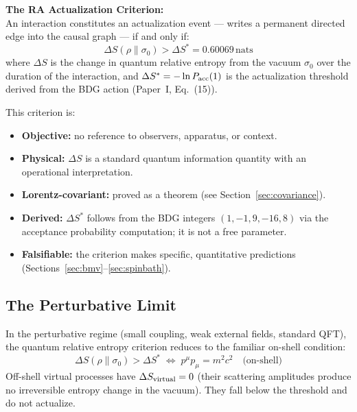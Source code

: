 \documentclass[12pt,a4paper]{article}
\begin{document}
\begin{mdframed}[linecolor=cv_blue!60,backgroundcolor=cv_blue!5,linewidth=1.5pt]
\textbf{The RA Actualization Criterion:}\\[0.3em]
An interaction constitutes an actualization event --- writes a permanent directed edge into the causal graph --- if and only if:
\begin{equation}
  \Delta S(\rho\|\sigma_0) > \Delta S^* = 0.60069\,\mathrm{nats}
  \label{eq:criterion}
\end{equation}
where $\Delta S$ is the change in quantum relative entropy from the vacuum $\sigma_0$ over the duration of the interaction, and $\Delta S^* = -\ln P_{\rm acc}(1)$ is the actualization threshold derived from the BDG action (Paper~I, Eq.~(15)).
\end{mdframed}

This criterion is:
\begin{itemize}
  \item \textbf{Objective:} no reference to observers, apparatus, or context.
  \item \textbf{Physical:} $\Delta S$ is a standard quantum information quantity with an operational interpretation.
  \item \textbf{Lorentz-covariant:} proved as a theorem (see Section~\ref{sec:covariance}).
  \item \textbf{Derived:} $\Delta S^*$ follows from the BDG integers $(1,-1,9,-16,8)$ via the acceptance probability computation; it is not a free parameter.
  \item \textbf{Falsifiable:} the criterion makes specific, quantitative predictions (Sections~\ref{sec:bmv}--\ref{sec:spinbath}).
\end{itemize}

\subsection{The Perturbative Limit}

In the perturbative regime (small coupling, weak external fields, standard QFT), the quantum relative entropy criterion reduces to the familiar on-shell condition:
\begin{equation}
  \Delta S(\rho\|\sigma_0)>\Delta S^* \;\Longleftrightarrow\; p^\mu p_\mu = m^2c^2 \quad\text{(on-shell)}
  \label{eq:on_shell}
\end{equation}
Off-shell virtual processes have $\Delta S_{\rm virtual}=0$ (their scattering amplitudes produce no irreversible entropy change in the vacuum).  They fall below the threshold and do not actualize.
\end{document}
